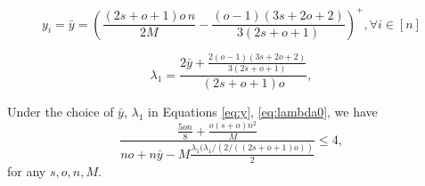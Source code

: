 \documentclass[10pt,a4paper]{amsart}
\begin{document}
\begin{equation} \label{eq:y}
y_i = \bar y = \left(\frac{(2s+o+1)o\,n}{2M}
-\frac{(o-1)(3s+2o+2)}{3(2s+o+1)} \right)^{+}, \forall i \in [n]
\end{equation}

\begin{equation} \label{eq:lambda0}
\lambda_1 = \frac{2 \bar y + \frac{2(o-1)(3s+2o+2)}{3(2s+o+1)}}{(2s+o+1)o},
\end{equation}

\begin{lemma} \label{lem:cp4}
    Under the choice of $\bar y$, $\lambda_1$ in Equations \eqref{eq:y}, \eqref{eq:lambda0}, we have
    \[
    \frac{\frac{5 o n}{8}+\frac{o(s+o)n^2}{M}}{no + n \bar y - M \frac{\lambda_1(\lambda_1/(2/((2s+o+1)o))}{2}} \leq 4,
    \]
    for any $s,o,n,M$.
\end{lemma}
\end{document}
